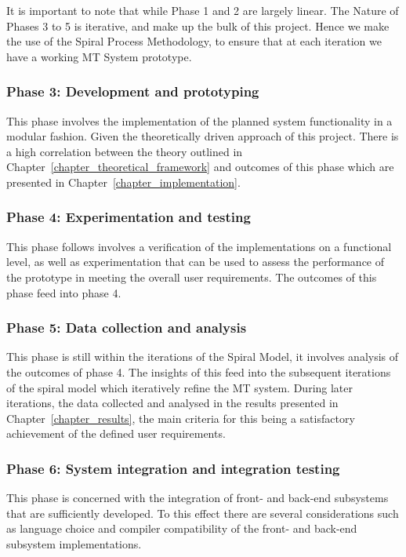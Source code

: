 It is important to note that while Phase 1 and 2 are largely linear. The Nature
of Phases 3 to 5 is iterative, and make up the bulk of this project. Hence we
make the use of the Spiral Process Methodology, to ensure that at each iteration
we have a working MT System prototype.  

\subsubsection{Phase 3: Development and prototyping}
This phase involves the implementation of the planned system functionality in a
modular fashion. Given the theoretically driven approach of this project. There
is a high correlation between the theory outlined in
Chapter~\ref{chapter_theoretical_framework} and outcomes of this phase which are
presented in Chapter~\ref{chapter_implementation}.

\subsubsection{Phase 4: Experimentation and testing}
This phase follows involves a verification of the implementations on a
functional level, as well as experimentation that can be used to assess the
performance of the prototype in meeting the overall user requirements. The
outcomes of this phase feed into phase 4. 

\subsubsection{Phase 5: Data collection and analysis}
This phase is still within the iterations of the Spiral Model, it involves
analysis of the outcomes of phase 4. The insights of this feed into the 
subsequent iterations of the spiral model which iteratively refine the MT
system. 
During later iterations, the data collected and analysed in the results
presented in 
Chapter~\ref{chapter_results}, the main criteria for this being a satisfactory achievement
of the defined user requirements.

\subsubsection{Phase 6: System integration and integration testing}
This phase is concerned with the integration of front- and back-end subsystems that
are sufficiently developed. To this effect there are several considerations such
as language choice and compiler compatibility of the front- and back-end
subsystem implementations. 


